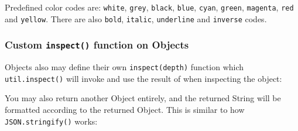 Predefined color codes are: \texttt{white}, \texttt{grey},
\texttt{black}, \texttt{blue}, \texttt{cyan}, \texttt{green},
\texttt{magenta}, \texttt{red} and \texttt{yellow}. There are also
\texttt{bold}, \texttt{italic}, \texttt{underline} and \texttt{inverse}
codes.

\subsubsection{Custom \texttt{inspect()} function on
Objects}\label{custom-inspect-function-on-objects}

Objects also may define their own \texttt{inspect(depth)} function which
\texttt{util.inspect()} will invoke and use the result of when
inspecting the object:

\begin{Shaded}
\begin{Highlighting}[]
 \NormalTok{(}\NormalTok{);}

 \NormalTok{: } \NormalTok{\};}
 \NormalTok{= }
    \NormalTok{+ } \NormalTok{+ }\NormalTok{;}
\NormalTok{\};}

\end{Highlighting}
\end{Shaded}

You may also return another Object entirely, and the returned String
will be formatted according to the returned Object. This is similar to
how \texttt{JSON.stringify()} works:

\begin{Shaded}
\begin{Highlighting}[]
 \NormalTok{: } \NormalTok{\};}
 \NormalTok{= }
   \NormalTok{\{ }\NormalTok{: } \NormalTok{\};}
\NormalTok{\};}

\end{Highlighting}
\end{Shaded}

